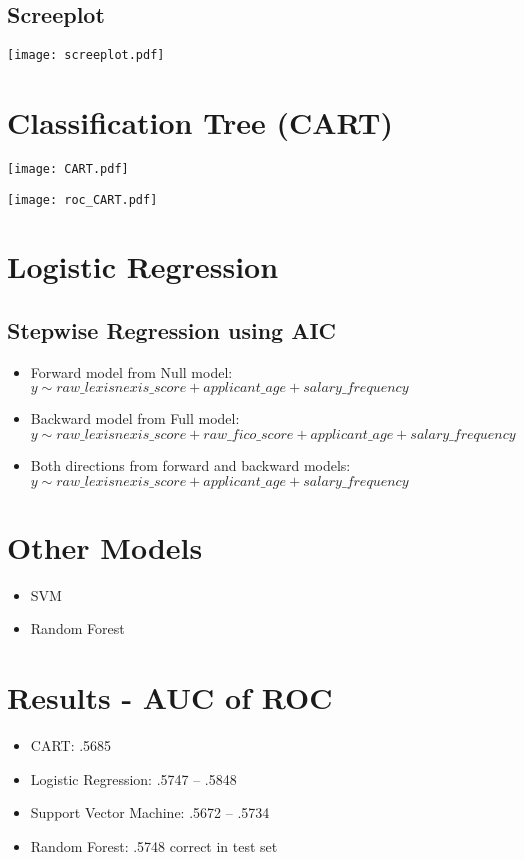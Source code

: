 \documentclass[a4paper, landscape]{article}
\begin{document}
\subsection{Screeplot}
\centerline{\texttt{[image: screeplot.pdf]}}

\section{Classification Tree (CART)}
\texttt{[image: CART.pdf]}


\texttt{[image: roc\_CART.pdf]}

\newpage
\section{Logistic Regression}
\subsection{Stepwise Regression using AIC}

\begin{itemize}
	\item Forward model from Null model: $y \sim raw\_lexisnexis\_score + applicant\_age + salary\_frequency$
	\item Backward model from Full model: $y \sim raw\_lexisnexis\_score + raw\_fico\_score + applicant\_age + salary\_frequency$
	\item Both directions from forward and backward models: $y \sim raw\_lexisnexis\_score + applicant\_age + salary\_frequency$
\end{itemize}

\section{Other Models}
\begin{itemize}
	\item SVM
	\item Random Forest
\end{itemize}

\section{Results - AUC of ROC}

\begin{itemize}
	\item CART: .5685
	\item Logistic Regression: .5747 -- .5848
	\item Support Vector Machine: .5672 -- .5734
	\item Random Forest: .5748 correct in test set
\end{itemize}
\end{document}
